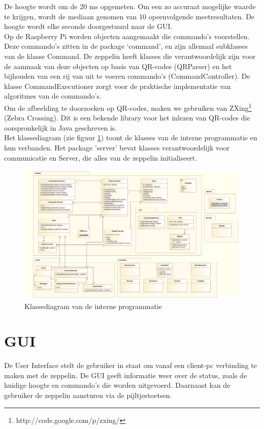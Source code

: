 \documentclass[eind]{penoverslag}
\begin{document}
De hoogte wordt om de 20 ms opgemeten. Om een zo accuraat mogelijke waarde te krijgen, wordt de mediaan genomen van 10 opeenvolgende meetresultaten. De hoogte wordt elke seconde doorgestuurd naar de GUI. \\

Op de Raspberry Pi worden objecten aangemaakt die commando's voorstellen. Deze commando's zitten in de package `command', en zijn allemaal subklasses van de klasse Command. De zeppelin heeft klasses die verantwoordelijk zijn voor de aanmaak van deze objecten op basis van QR-codes (QRParser) en het bijhouden van een rij van uit te voeren commando's (CommandController). De klasse CommandExecutioner zorgt voor de praktische implementatie van algoritmes van de commando's. \\

Om de afbeelding te doorzoeken op QR-codes, maken we gebruiken van ZXing\footnote{http://code.google.com/p/zxing/} (Zebra Crossing). Dit is een bekende library voor het inlezen van QR-codes die oorspronkelijk in Java geschreven is. \\

Het klassediagram (zie figuur \ref{UML}) toont de klasses van de interne programmatie en hun verbanden. Het package 'server' bevat klasses verantwoordelijk voor communicatie en Server, die alles van de zeppelin initialiseert.

\begin{figure}[!ht]
\centering
\includegraphics[scale=0.3]{UML.png}
\caption{Klassediagram van de interne programmatie}
\label{UML}
\end{figure}

\section{GUI}
De User Interface stelt de gebruiker in staat om vanaf een client-pc verbinding te maken met de zeppelin. De GUI geeft informatie weer over de status, zoals de huidige hoogte en commando's die worden uitgevoerd. Daarnaast kan de gebruiker de zeppelin aansturen via de pijltjestoetsen. \\
\end{document}
